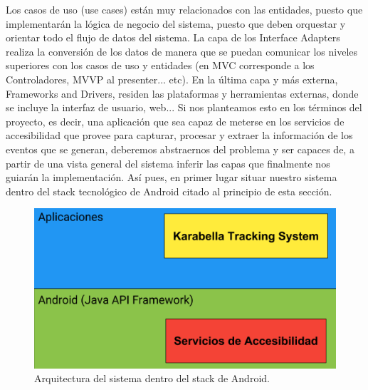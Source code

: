 \documentclass[12pt,a4paper,oneside]{book} %
\begin{document}
Los casos de uso (use cases) están muy relacionados con las entidades, puesto que implementarán la lógica de negocio del sistema, puesto que deben orquestar y orientar todo el flujo de datos del sistema. 
\newline
\newline
La capa de los Interface Adapters realiza la conversión de los datos de manera que se puedan comunicar los niveles superiores con los casos de uso y entidades (en MVC corresponde a los Controladores, MVVP al presenter... etc). 
\newline
\newline
En la última capa y más externa, Frameworks and Drivers, residen las plataformas y herramientas externas, donde se incluye la interfaz de usuario, web... 
\newline
\newline
Si nos planteamos esto en los términos del proyecto, es decir, una aplicación que sea capaz de meterse en los servicios de accesibilidad que provee para capturar, procesar y extraer la  información de los eventos que se generan, deberemos abstraernos del problema y ser capaces de, a partir de una vista general del sistema inferir las capas que finalmente nos guiarán la implementación. 
\newline
\newline
Así pues, en primer lugar situar nuestro sistema dentro del stack tecnológico de Android citado al principio de esta sección. 
\newline
\begin{figure}[H]
	\begin{center}
		\includegraphics[scale=0.6]{pictures/architecture/arquitecturaGeneral01.png} 
	\end{center}
	\caption[Arquitectura dentro del android stack]{Arquitectura del sistema dentro del stack de Android.}
\end{figure}
\end{document}
